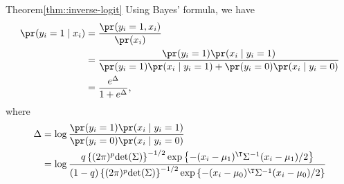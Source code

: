 \begin{myproof}{Theorem}{\ref{thm::inverse-logit}}
Using Bayes' formula, we have
\begin{align*}
\pr(y_{i}  =1\mid x_{i}) &=\frac{\pr(y_{i}=1,x_{i})}{\pr(x_{i})}\\
 & =\frac{\pr(y_{i}=1)\pr(x_{i}\mid y_{i}=1)}{\pr(y_{i}=1)\pr(x_{i}\mid y_{i}=1)+\pr(y_{i}=0)\pr(x_{i}\mid y_{i}=0)}\\
 &= \frac{ e^\Delta}{1+ e^\Delta},
\end{align*}
%
where
\begin{align*}
\Delta 
&= \log  \frac{\pr(y_{i}=1)\pr(x_{i}\mid y_{i}=1)}{ \pr(y_{i}=0)\pr(x_{i}\mid y_{i}=0) } \\
&=\log \frac{q\left\{ (2\pi)^p \text{det}(\Sigma)\right\} ^{-1/2}\exp\left\{ -(x_{i}-\mu_{1})^{\T}\Sigma^{-1}(x_{i}-\mu_{1})/2\right\}}
{  (1-q)\left\{ (2\pi)^p \text{det}(\Sigma)\right\} ^{-1/2}\exp\left\{ -(x_{i}-\mu_{0})^{\T}\Sigma^{-1}(x_{i}-\mu_{0})/2\right\} }\\

\end{align*}
\end{myproof}
